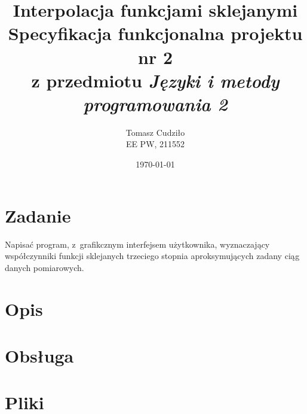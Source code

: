 \documentclass[10pt,a4paper]{article}
\begin{document}
\title{ 
  Interpolacja funkcjami sklejanymi\\
  {\normalsize Specyfikacja funkcjonalna projektu nr 2}\\\vspace{-12pt}
  {\normalsize z przedmiotu \emph{Języki i metody programowania 2}}
}
\author{
  Tomasz Cudziło\\
  {\small EE PW, 211552}
}
\date{\today}
\maketitle

\section*{Zadanie}
\label{sec:zadanie}

Napisać program, z~grafikcznym interfejsem użytkownika, wyznaczający
współczynniki funkcji sklejanych trzeciego stopnia aproksymujących zadany ciąg
danych pomiarowych.

\vspace{24pt}

\section{Opis}
\label{sec:opis}

\section{Obsługa}
\label{sec:obsluga}

\section{Pliki}
\label{sec:pliki}
\end{document}
